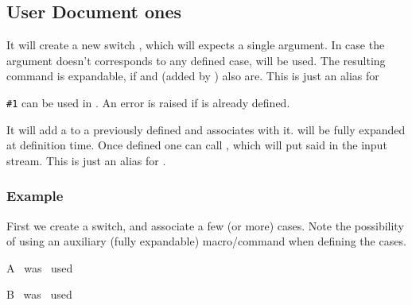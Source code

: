 \documentclass[10pt]{article}
\begin{document}
\subsection{User Document ones}
\begin{codedescribe}{\newswitch}
\begin{codesyntax}%
\tsobj{\newswitch}  
\end{codesyntax}
It will create a new switch , which will expects a single argument. In case the argument doesn't corresponds to any defined case,  will be used. The resulting  command is expandable, if  and  (added by \tsobj{\addcase}) also are. This is just an alias for 
\end{codedescribe}
\begin{tsremark}
  \verb|#1| can be used in . An error is raised if  is already defined.
\end{tsremark}

\begin{codedescribe}{\addcase}
\begin{codesyntax}%
\tsobj{\addcase}  
\end{codesyntax}
It will add a  to a previously defined  and associates  with it.  will be fully expanded at definition time. Once defined one can call , which will put said  in the input stream.   This is just an alias for .
\end{codedescribe}

\subsubsection{Example}

First we create a switch, and associate a few (or more) cases. Note the possibility of using an auxiliary (fully expandable) macro/command when defining the cases.
\begin{codestore}[switch02]
\def\CaseAstring{case-A}
\newswitch {}
\addcase   \myCase  {\CaseAstring} {A~ was~ used\par}
\addcase   {}       {B~ was~ used\par}
\end{codestore}
\end{document}
